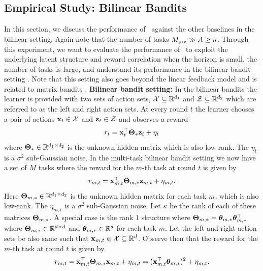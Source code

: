 \documentclass[10pt]{article}
\theoremstyle{plain}
\theoremstyle{definition}
\theoremstyle{remark}
\begin{document}
\subsection{Empirical Study: Bilinear Bandits}
\label{sec:bilinear}
In this section, we discuss the performance of \pred\ against the other baselines in the bilinear setting.
Again note that the number of tasks $M_{\text{pre}} \gg A \geq n$.
Through this experiment, we want to evaluate the performance of \pred\ to exploit the underlying latent structure and reward correlation when the horizon is small, the number of tasks is large, and understand its performance in the bilinear bandit setting \citep{jun2019bilinear, lu2021low, kang2022efficient, mukherjee2023multi}.
Note that this setting also goes beyond the linear feedback model \citep{abbasi2011improved, lattimore2020bandit} and is related to matrix bandits \citep{yang2020reinforcement}.
\textbf{Bilinear bandit setting:} In the bilinear bandits the learner is provided with two sets of action sets, $\mathcal{X}\subseteq\mathbb{R}^{d_1}$ and $\mathcal{Z}\subseteq\mathbb{R}^{d_2}$ which are referred to as the left and right action sets. At every round $t$ the learner chooses a pair of actions $\mathbf{x}_t\in\mathcal{X}$ and $\mathbf{z}_t\in\mathcal{Z}$ and observes a reward
\begin{align*}
    r_t = \mathbf{x}_t^\top \mathbf{\Theta}_* \mathbf{z}_t + \eta_t
\end{align*}
where $\mathbf{\Theta}_*\in\mathbb{R}^{d_1\times d_2}$ is the unknown hidden matrix which is also low-rank. The $\eta_t$ is a $\sigma^2$ sub-Gaussian noise. In the multi-task bilinear bandit setting we now have a set of $M$ tasks where the reward for the $m$-th task at round $t$ is given by
\begin{align*}
    r_{m,t} = \mathbf{x}_{m,t}^\top \mathbf{\Theta}_{m,*} \mathbf{z}_{m,t} + \eta_{m,t}.
\end{align*}
Here  $\mathbf{\Theta}_{m,*}\in\mathbb{R}^{d_1\times d_2}$ is the unknown hidden matrix for each task $m$, which is also low-rank. The $\eta_{m,t}$ is a $\sigma^2$ sub-Gaussian noise. Let $\kappa$ be the rank of each of these matrices $\mathbf{\Theta}_{m, *}$.
A special case is the rank $1$ structure where $\mathbf{\Theta}_{m, *} = \boldsymbol{\theta}_{m,*}\boldsymbol{\theta}_{m,*}^\top$ where $\mathbf{\Theta}_{m,*} \in \mathbb{R}^{d \times d}$ and $\boldsymbol{\theta}_{m,*}\in\mathbb{R}^d$ for each task $m$. Let the left and right action sets be also same such that $\mathbf{x}_{m,t} \in \mathcal{X} \subseteq \mathbb{R}^{d}$. Observe then that the reward for the $m$-th task at round $t$ is given by
\begin{align*}
    r_{m,t} = \mathbf{x}_{m,t}^\top \mathbf{\Theta}_{m,*} \mathbf{x}_{m,t} + \eta_{m,t} = (\mathbf{x}_{m,t}^\top\boldsymbol{\theta}_{m, *})^2 + \eta_{m,t}.
\end{align*}
\end{document}
